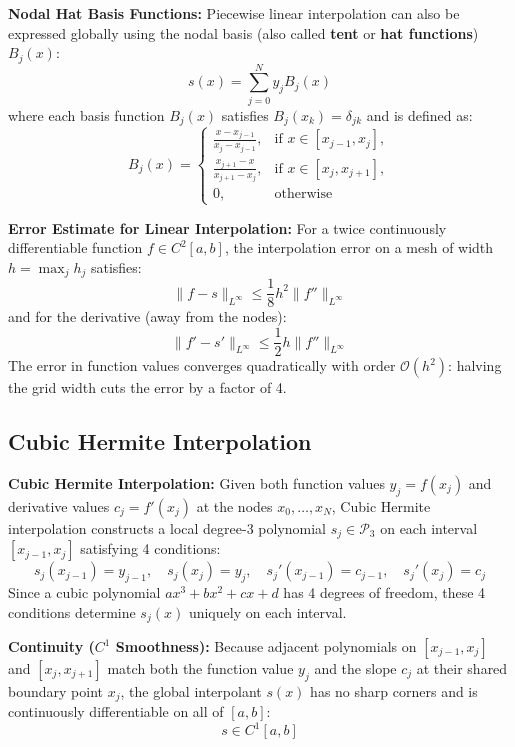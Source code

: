 \begin{definition}
    \textbf{Nodal Hat Basis Functions:} Piecewise linear interpolation can also be expressed globally using the nodal basis (also called \textbf{tent} or \textbf{hat functions}) $B_j(x)$:
    $$s(x) = \sum_{j=0}^N y_j B_j(x)$$
    where each basis function $B_j(x)$ satisfies $B_j(x_k) = \delta_{jk}$ and is defined as:
    $$B_j(x) = \begin{cases}
        \frac{x - x_{j-1}}{x_j - x_{j-1}}, & \text{if } x \in [x_{j-1}, x_j], \\
        \frac{x_{j+1} - x}{x_{j+1} - x_j}, & \text{if } x \in [x_j, x_{j+1}], \\
        0, & \text{otherwise}
    \end{cases}$$
\end{definition}

\begin{theorem}
    \textbf{Error Estimate for Linear Interpolation:} For a twice continuously differentiable function $f \in C^2[a,b]$, the interpolation error on a mesh of width $h = \max_j h_j$ satisfies:
    $$\|f - s\|_{L^\infty} \le \frac{1}{8} h^2 \|f''\|_{L^\infty}$$
    and for the derivative (away from the nodes):
    $$\|f' - s'\|_{L^\infty} \le \frac{1}{2} h \|f''\|_{L^\infty}$$
    The error in function values converges quadratically with order $\mathcal{O}(h^2)$: halving the grid width cuts the error by a factor of 4.
\end{theorem}

\subsection{Cubic Hermite Interpolation}

\begin{definition}
    \textbf{Cubic Hermite Interpolation:} Given both function values $y_j = f(x_j)$ and derivative values $c_j = f'(x_j)$ at the nodes $x_0, \dots, x_N$, Cubic Hermite interpolation constructs a local degree-3 polynomial $s_j \in \mathcal{P}_3$ on each interval $[x_{j-1}, x_j]$ satisfying 4 conditions:
    $$s_j(x_{j-1}) = y_{j-1}, \quad s_j(x_j) = y_j, \quad s_j'(x_{j-1}) = c_{j-1}, \quad s_j'(x_j) = c_j$$
    Since a cubic polynomial $a x^3 + b x^2 + c x + d$ has 4 degrees of freedom, these 4 conditions determine $s_j(x)$ uniquely on each interval.
\end{definition}

\begin{remark}
    \textbf{Continuity ($C^1$ Smoothness):} Because adjacent polynomials on $[x_{j-1}, x_j]$ and $[x_j, x_{j+1}]$ match both the function value $y_j$ and the slope $c_j$ at their shared boundary point $x_j$, the global interpolant $s(x)$ has no sharp corners and is continuously differentiable on all of $[a,b]$:
    $$s \in C^1[a,b]$$
\end{remark}

